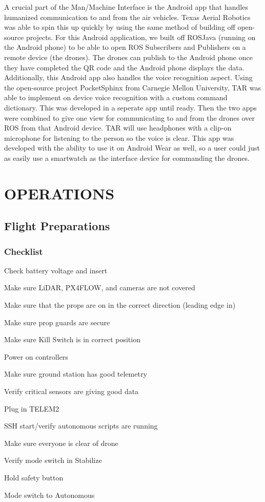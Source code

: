\documentclass[12pt,letterpaper]{article}
\newenvironment{my_enumerate}{
	\begin{enumerate}
	\setlength{\itemsep}{1pt}
	\setlength{\parskip}{0pt}
	\setlength{\parsep}{0pt}}{\end{enumerate}
}
\begin{document}
	A crucial part of the Man/Machine Interface is the Android app that handles humanized communication to and from the air vehicles. Texas Aerial Robotics was able to spin this up quickly by using the same method of building off open-source projects. For this Android application, we built off ROSJava (running on the Android phone) to be able to open ROS Subscribers and Publishers on a remote device (the drones). The drones can publish to the Android phone once they have completed the QR code and the Android phone displays the data. Additionally, this Android app also handles the voice recognition aspect. Using the open-source project PocketSphinx from Carnegie Mellon University, TAR was able to implement on device voice recognition with a custom command dictionary. This was developed in a seperate app until ready. Then the two apps were combined to give one view for communicating to and from the drones over ROS from that Android device. TAR will use headphones with a clip-on microphone for listening to the person so the voice is clear. This app was developed with the ability to use it on Android Wear as well, so a user could just as easily use a smartwatch as the interface device for commanding the drones.


\section*{OPERATIONS}
	\subsection*{Flight Preparations}
		\subsubsection*{Checklist}
			\begin{my_enumerate}
				\item Check battery voltage and insert
				\item Make sure LiDAR, PX4FLOW, and cameras are not covered
				\item Make sure that the props are on in the correct direction (leading edge in)
				\item Make sure prop guards are secure
				\item Make sure Kill Switch is in correct position
				\item Power on controllers
				\item Make sure ground station has good telemetry
				\item Verify critical sensors are giving good data
				\item Plug in TELEM2
				\item SSH start/verify autonomous scripts are running
				\item Make sure everyone is clear of drone
				\item Verify mode switch in Stabilize
				\item Hold safety button
				\item Mode switch to Autonomous
			\end{my_enumerate}
\end{document}
